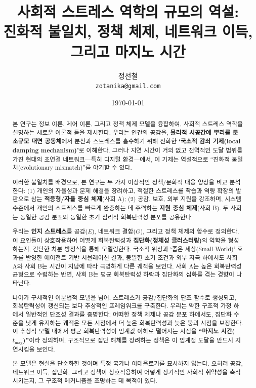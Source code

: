\documentclass[11pt]{article}
\title{사회적 스트레스 역학의 규모의 역설:\\
진화적 불일치, 정책 체제, 네트워크 이득, 그리고 마지노 시간}
\author{정선철\\[4pt]
\small \texttt{zotanika@gmail.com}
}
\date{\today}
\theoremstyle{plain}
\begin{document}
\maketitle

\begin{abstract}
본 연구는 정보 이론, 제어 이론, 그리고 정책 체제 모델을 융합하여, 사회적 스트레스 역학을 설명하는 새로운 이론적 틀을 제시한다.
우리는 인간의 공감을, \textbf{물리적 시공간에 뿌리를 둔 소규모 대면 공동체}에서 분산과 스트레스를 흡수하기 위해 진화한 \textbf{`국소적 감쇠 기제(local damping mechanism)'}로 이해한다.
그러나 지연 시간이 거의 없고 전역적인 도달 범위를 가진 현대의 초연결 네트워크---특히 디지털 환경---에서, 이 기제는 역설적으로 ``진화적 불일치(evolutionary mismatch)''를 야기할 수 있다.

이러한 불일치를 배경으로, 본 연구는 두 가지 이상적인 정책/문화적 대응 양상을 비교 분석한다:
(1) 개인의 자율성과 문제 해결을 장려하고, 적절한 스트레스를 학습과 역량 확장의 발판으로 삼는 \textbf{적응형/자율 중심 체제}(사회 A);
(2) 공감, 보호, 외부 지원을 강조하며, 시스템 수준에서 개인의 스트레스를 빠르게 완충하는 데 주력하는 \textbf{지원 중심 체제}(사회 B).
두 사회는 동일한 공감 분포와 동일한 초기 심리적 회복탄력성 분포를 공유한다.

우리는 \textbf{인지 스트레스}를 공감($E$), 네트워크 결합($G$), 그리고 정책 체제의 함수로 정의한다. 이 요인들이 상호작용하여 어떻게 회복탄력성과 \textbf{집단화(정체성 클러스터링)}의 역학을 형성하는지, 간단한 차분 방정식을 통해 모델링한다.
국소적 위상과 `좁은 세상(Small-World)' 효과를 반영한 에이전트 기반 시뮬레이션 결과, 동일한 초기 조건과 외부 자극 하에서도 사회 A와 사회 B는 시간이 지남에 따라 극명하게 다른 궤적을 보인다.
사회 A는 높은 회복탄력성 균형으로 수렴하는 반면, 사회 B는 평균 회복탄력성 하락과 집단화의 심화를 겪는 경향이 나타난다.

나아가 구체적인 이분법적 모델을 넘어, 스트레스가 공감/집단화의 단조 함수로 생성되고, 회복탄력성이 갱신되는 보다 추상적인 프레임워크를 구축한다.
우리는 약한 구조적 가정 하에서 일반적인 단조성 결과를 증명한다: 어떠한 정책 체제나 공감 분포 하에서도, 집단화 수준을 낮게 유지하는 궤적은 모든 시점에서 더 높은 회복탄력성과 늦은 붕괴 시점을 보장한다.
이 추상적 모델 내에서 평균 회복탄력성이 임계값 이하로 떨어지는 시점을 \textbf{``마지노 시간($t_{\text{mag}}$)''}이라 정의하며, 구조적으로 집단 해체를 장려하는 정책은 이 임계점 도달을 반드시 지연시킴을 보인다.

본 모델은 현실을 단순화한 것이며 특정 국가나 이데올로기를 묘사하지 않는다. 오히려 공감, 네트워크 이득, 집단화, 그리고 정책이 상호작용하여 어떻게 장기적인 사회적 취약성을 축적시키는지, 그 구조적 메커니즘을 조명하는 데 목적이 있다.
\end{abstract}
\end{document}
